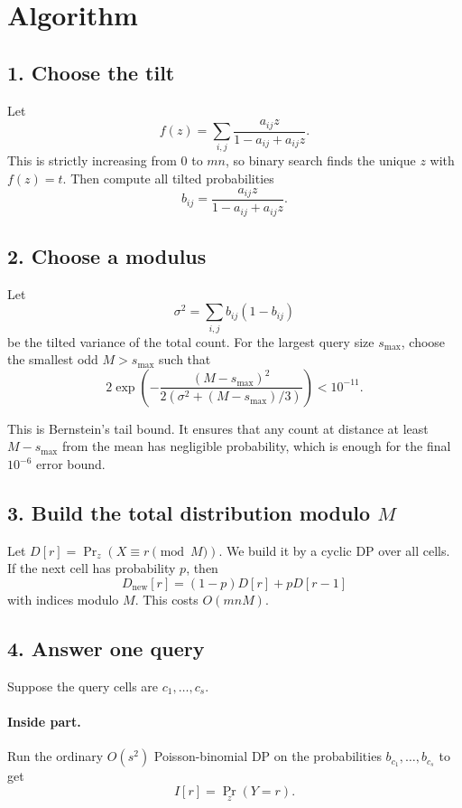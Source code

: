\documentclass[11pt]{article}
\begin{document}
\section*{Algorithm}

\subsection*{1. Choose the tilt}

Let
\[
    f(z)=\sum_{i,j}\frac{a_{ij}z}{1-a_{ij}+a_{ij}z}.
\]
This is strictly increasing from $0$ to $mn$, so binary search finds the unique $z$ with $f(z)=t$.
Then compute all tilted probabilities
\[
    b_{ij}= \frac{a_{ij}z}{1-a_{ij}+a_{ij}z}.
\]

\subsection*{2. Choose a modulus}

Let
\[
    \sigma^2=\sum_{i,j} b_{ij}(1-b_{ij})
\]
be the tilted variance of the total count.
For the largest query size $s_{\max}$, choose the smallest odd $M>s_{\max}$ such that
\[
    2\exp\!\left(-\frac{(M-s_{\max})^2}{2(\sigma^2+(M-s_{\max})/3)}\right) < 10^{-11}.
\]

This is Bernstein's tail bound. It ensures that any count at distance at least $M-s_{\max}$ from the mean has
negligible probability, which is enough for the final $10^{-6}$ error bound.

\subsection*{3. Build the total distribution modulo $M$}

Let $D[r]=\Pr_z(X\equiv r \pmod M)$.
We build it by a cyclic DP over all cells.
If the next cell has probability $p$, then
\[
    D_{\text{new}}[r]=(1-p)D[r]+pD[r-1]
\]
with indices modulo $M$.
This costs $O(mnM)$.

\subsection*{4. Answer one query}

Suppose the query cells are $c_1,\dots,c_s$.

\paragraph{Inside part.}
Run the ordinary $O(s^2)$ Poisson-binomial DP on the probabilities $b_{c_1},\dots,b_{c_s}$ to get
\[
    I[r]=\Pr_z(Y=r).
\]
\end{document}
